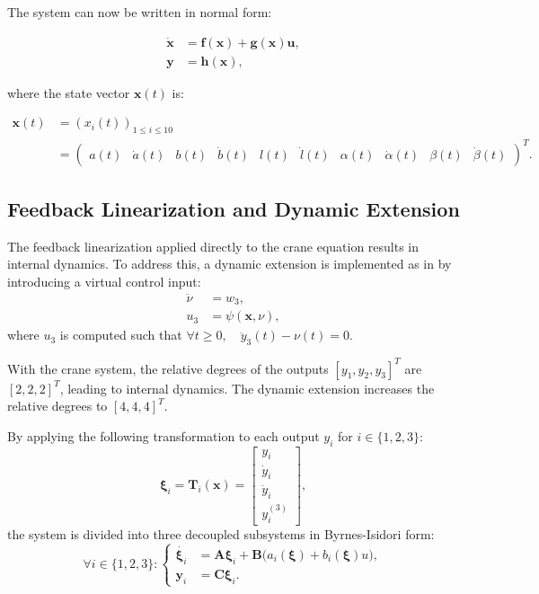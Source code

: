 The system can now be written in normal form:

\begin{align*}
    \dot{\boldsymbol{x}} &= \boldsymbol{f}(\boldsymbol{x}) + \boldsymbol{g}(\boldsymbol{x})\boldsymbol{u}, \\
    \boldsymbol{y} &= \boldsymbol{h}(\boldsymbol{x}),
\end{align*}

where the state vector \(\boldsymbol{x}(t)\) is:

\begin{align*}
    \boldsymbol{x}(t) &= (x_i(t))_{1\le i\le 10} \\
    &= \begin{pmatrix} a(t) & \dot{a}(t) & b(t) & \dot{b}(t) & l(t) & \dot{l}(t) & \alpha(t) & \dot{\alpha}(t) & \beta(t) & \dot{\beta}(t)\end{pmatrix}^T.
\end{align*}

\subsection{Feedback Linearization and Dynamic Extension}

The feedback linearization applied directly to the crane equation results in internal dynamics. To address this, a dynamic extension is implemented as in \cite{Noack2020} by introducing a virtual control input:
\begin{align}
    \ddot{\nu} &= w_3, \\
    u_3 &= \psi(\boldsymbol{x}, \nu),
\end{align}
where \(u_3\) is computed such that \(\forall t \ge 0, \quad \ddot{y}_3(t) - \nu(t) = 0\).

With the crane system, the relative degrees of the outputs \([y_1, y_2, y_3]^T\) are \([2, 2, 2]^T\), leading to internal dynamics. The dynamic extension increases the relative degrees to \([4, 4, 4]^T\).

By applying the following transformation to each output \(y_i\) for \(i \in \{1, 2, 3\}\):
\begin{equation}
\boldsymbol{\xi}_i = \boldsymbol{T}_i(\boldsymbol{x}) = \begin{bmatrix} y_i \\ \dot{y}_i \\ \ddot{y}_i \\ y^{(3)}_i \end{bmatrix},
\end{equation}
the system is divided into three decoupled subsystems in Byrnes-Isidori form:
\begin{equation}
\label{eq:flat_sys_reduced}
\forall i \in \{1, 2, 3\} :
\left\{
\begin{aligned}
  \dot{\boldsymbol{\xi}_i} &= \boldsymbol{A} \boldsymbol{\xi}_i + \boldsymbol{B} \big(a_i(\boldsymbol{\xi}) + b_i(\boldsymbol{\xi})u\big), \\
  \boldsymbol{y}_i &= \boldsymbol{C} \boldsymbol{\xi}_i.
\end{aligned}
\right.
\end{equation}

